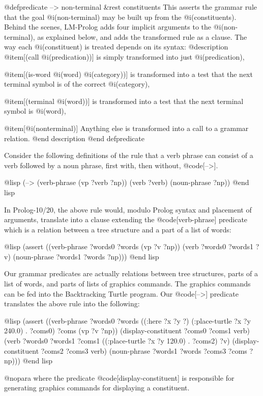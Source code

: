 {@defpredicate --> non-terminal &rest constituents
This asserts the grammar rule that the goal @i(non-terminal)
may be built up from the @i(constituents).
Behind the scenes, LM-Prolog adds four implicit arguments to the 
@i(non-terminal), as explained below,  and adds the transformed rule
as a clause.
The way each @i(constituent) is treated depends on its syntax:
@description
@item[(call @i(predication))]
is simply transformed into just @i(predication),

@item[(is-word @i(word) @i(category))]
is transformed into a test that the next terminal symbol is of
the correct @i(category),

@item[(terminal @i(word))]
is transformed into a test that the next terminal symbol is @i(word),

@item[@i(nonterminal)]
Anything else is transformed into a call to a grammar relation.
@end description
@end defpredicate

Consider the following definitions of
the rule that a verb phrase can consist of a verb followed by a
noun phrase, first with, then without, @code[-->].

@lisp
(--> (verb-phrase (vp ?verb ?np))
     (verb ?verb)
     (noun-phrase ?np))
@end lisp

In Prolog-10/20, the above rule would,
modulo Prolog syntax and placement of arguments,
translate into a clause
extending the @code[verb-phrase] predicate which is a relation between
a tree structure and a part of a list of words:

@lisp
(assert ((verb-phrase ?words0 ?words (vp ?v ?np))
         (verb ?words0 ?words1 ?v)
         (noun-phrase ?words1 ?words ?np)))
@end lisp

Our grammar predicates are actually relations between
tree structures, parts of a list of words,
and parts of lists of graphics commands.
The graphics commands can be fed into the Backtracking Turtle program.
Our @code[-->] predicate translates the above rule into the following:

@lisp
(assert
 ((verb-phrase ?words0 ?words
               ((:here ?x ?y ?) 
                (:place-turtle ?x ?y 240.0) . ?coms0) 
               ?coms
               (vp ?v ?np))
  (display-constituent ?coms0 ?coms1 verb)
  (verb ?words0 ?words1
        ?coms1 ((:place-turtle ?x ?y 120.0) . ?coms2)
        ?v)
  (display-constituent ?coms2 ?coms3 verb)
  (noun-phrase ?words1 ?words ?coms3 ?coms ?np)))
@end lisp

@nopara
where the predicate @code[display-constituent] is responsible for generating
graphics commands for displaying a constituent.

}
